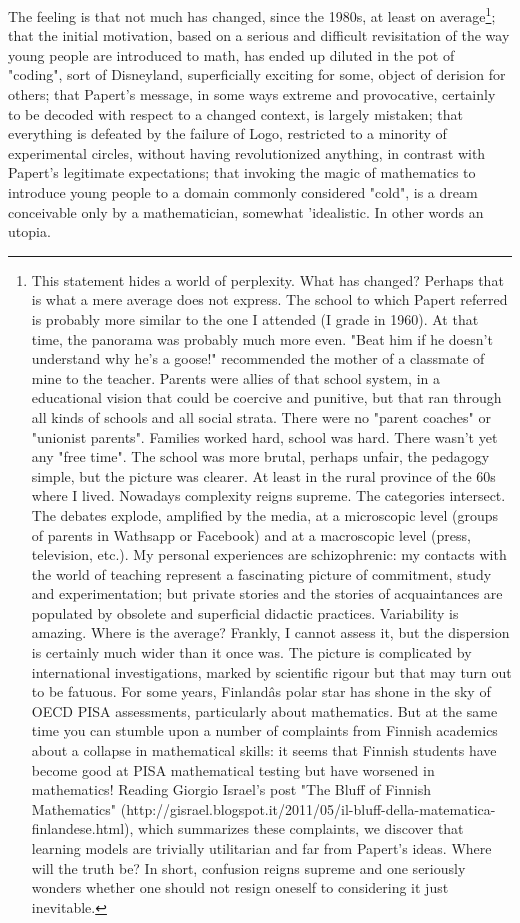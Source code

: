 The feeling is that not much has changed, since the 1980s, at least on average\footnote{This statement hides a world of perplexity. What has changed? Perhaps that is what a mere average does not express. The school to which Papert referred is probably more similar to the one I attended (I grade in 1960). At that time, the panorama was probably much more even. "Beat him if he doesn't understand why he's a goose!" recommended the mother of a classmate of mine to the teacher. Parents were allies of that school system, in a educational vision that could be coercive and punitive, but that ran through all kinds of schools and all social strata. There were no "parent coaches" or "unionist parents". Families worked hard, school was hard. There wasn't yet any "free time". The school was more brutal, perhaps unfair, the pedagogy simple, but the picture was clearer. At least in the rural province of the 60s where I lived. Nowadays complexity reigns supreme. The categories intersect. The debates explode, amplified by the media, at a microscopic level (groups of parents in Wathsapp or Facebook) and at a macroscopic level (press, television, etc.). My personal experiences are schizophrenic: my contacts with the world of teaching represent a fascinating picture of commitment, study and experimentation; but private stories and the stories of acquaintances are populated by obsolete and superficial didactic practices. Variability is amazing. Where is the average? Frankly, I cannot assess it, but the dispersion is certainly much wider than it once was. The picture is complicated by international investigations, marked by scientific rigour but that may turn out to be fatuous. For some years, Finlandâs polar star has shone in the sky of OECD PISA assessments, particularly about mathematics. But at the same time you can stumble upon a number of complaints from Finnish academics about a collapse in mathematical skills: it seems that Finnish students have become good at PISA mathematical testing but have worsened in mathematics! Reading Giorgio Israel's post "The Bluff of Finnish Mathematics" (http://gisrael.blogspot.it/2011/05/il-bluff-della-matematica-finlandese.html), which summarizes these complaints, we discover that learning models are trivially utilitarian and far from Papert's ideas. Where will the truth be? In short, confusion reigns supreme and one seriously wonders whether one should not resign oneself to considering it just inevitable.}; that the initial motivation, based on a serious and difficult revisitation of the way young people are introduced to math, has ended up diluted in the pot of "coding", sort of Disneyland, superficially exciting for some, object of derision for others; that Papert's message, in some ways extreme and provocative, certainly to be decoded with respect to a changed context, is largely mistaken; that everything is defeated by the failure of Logo, restricted to a minority of experimental circles, without having revolutionized anything, in contrast with  Papert's legitimate expectations; that invoking the magic of mathematics to introduce young people to a domain commonly considered "cold", is a dream conceivable only by a mathematician, somewhat 'idealistic. In other words an utopia.

